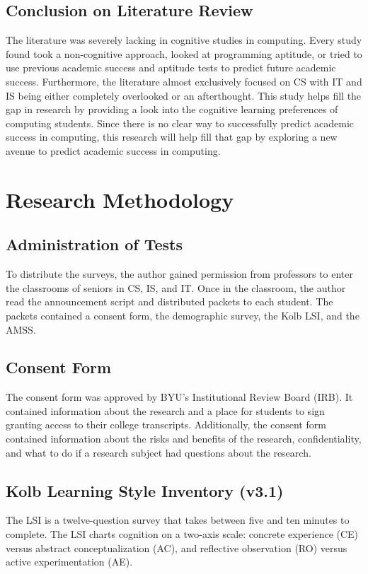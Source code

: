 \subsection{Conclusion on Literature Review}
The literature was severely lacking in cognitive studies in computing. Every study found took a non-cognitive approach, looked at programming aptitude, or tried to use previous academic success and aptitude tests to predict future academic success. Furthermore, the literature almost exclusively focused on CS with IT and IS being either completely overlooked or an afterthought. This study helps fill the gap in research by providing a look into the cognitive learning preferences of computing students. Since there is no clear way to successfully predict academic success in computing, this research will help fill that gap by exploring a new avenue to predict academic success in computing.

\section{Research Methodology}
\subsection{Administration of Tests}
To distribute the surveys, the author gained permission from professors to enter the classrooms of seniors in CS, IS, and IT. Once in the classroom, the author read the announcement script and distributed packets to each student. The packets contained a consent form, the demographic survey, the Kolb LSI, and the AMSS.

\subsection{Consent Form}
The consent form was approved by BYU's Institutional Review Board (IRB). It contained information about the research and a place for students to sign granting access to their college transcripts. Additionally, the consent form contained information about the risks and benefits of the research, confidentiality, and what to do if a research subject had questions about the research.

\subsection{Kolb Learning Style Inventory (v3.1)}
The LSI is a twelve-question survey that takes between five and ten minutes to complete. The LSI charts cognition on a two-axis scale: concrete experience (CE) versus abstract conceptualization (AC), and reflective observation (RO) versus active experimentation (AE).

